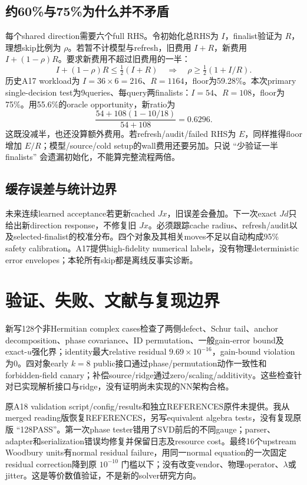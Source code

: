 \documentclass[UTF8,11pt,a4paper,fontset=fandol]{ctexart}
\begin{document}
\subsection{约60\%与75\%为什么并不矛盾}
每个shared direction需要六个full RHS。令初始化总RHS为 $I$，finalist验证为 $R$，理想skip比例为 $\rho$。若暂不计模型与refresh，旧费用 $I+R$，新费用 $I+(1-\rho)R$。要求新费用不超过旧费用的一半：
\[
 I+(1-\rho)R\leq\tfrac12(I+R)
 \quad\Longrightarrow\quad \rho\geq\tfrac12(1+I/R).
\]
历史A17 workload为 $I=36\times6=216$、$R=1164$，floor为59.28\%。本次primary single-decision test为9queries、每query两finalists：$I=54$、$R=108$，floor为75\%。用55.6\%的oracle opportunity，新ratio为
\[
 \frac{54+108(1-10/18)}{54+108}=0.6296.
\]
这既没减半，也还没算额外费用。若refresh/audit/failed RHS为 $E$，同样推得floor增加 $E/R$；模型/source/cold setup的wall费用还要另加。只说 ``少验证一半finalists'' 会遗漏初始化，不能算完整流程两倍。

\subsection{缓存误差与统计边界}
未来连续learned acceptance若更新cached $Jx$，旧误差会叠加。下一次exact $Jd$只给出新direction response，不修复旧 $Jx$。必须跟踪cache radius、refresh/audit以及selected-finalist的校准分布。四个对象及其相关moves不足以自动构成95\% safety calibration。A17提供high-fidelity numerical labels，没有物理deterministic error envelopes；本轮所有skip都是离线反事实诊断。

\section{验证、失败、文献与复现边界}
新写128个非Hermitian complex cases检查了两侧defect、Schur tail、anchor decomposition、phase covariance、ID permutation、一般gain-error bound及exact-$u$强化界；identity最大relative residual $9.69\times10^{-16}$，gain-bound violation为0。四对象early $k=8$ public接口通过phase/permutation动作一致性和forbidden-field canary；补偿source/ridge通过zero/scaling/additivity。这些检查针对已实现解析接口与ridge，没有证明尚未实现的NN架构合格。

原A18 validation script/config/results和独立REFERENCES原件未提供。我从merged reading版恢复REFERENCES，另写equivalent algebra tests，没有复现原版 ``128PASS''。第一次phase tester错用了SVD前后的不同gauge；parser、adapter和serialization错误均修复并保留日志及resource cost。最终16个upstream Woodbury units有normal residual failure，用同一normal equation的一次固定residual correction降到原 $10^{-10}$ 门槛以下；没有改变vendor、物理operator、$\lambda$或jitter。这是等价数值验证，不是新的solver研究方向。
\end{document}
